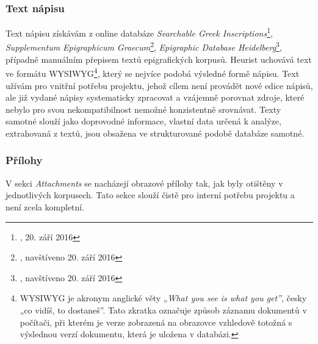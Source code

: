 \subsubsection[text-nápisu]{Text nápisu}

Text nápisu získávám z online databáze {\em Searchable Greek Inscriptions}\footnote{\from[url5], 20. září 2016}, {\em Supplementum Epigraphicum Graecum}\footnote{\from[url6], navštíveno 20. září 2016}, {\em Epigraphic Database Heidelberg}\footnote{\from[url7], navštíveno 20. září 2016}, případně manuálním přepisem textů epigrafických korpusů. Heurist uchovává text ve formátu WYSIWYG\footnote{WYSIWYG je akronym anglické věty „{\em What you see is what you get”}, česky „co vidíš, to dostaneš”. Tato zkratka označuje způsob záznamu dokumentů v počítači, při kterém je verze zobrazená na obrazovce vzhledově totožná s výslednou verzí dokumentu, která je uložena v databázi.}, který se nejvíce podobá výsledné formě nápisu. Text užívám pro vnitřní potřebu projektu, jehož cílem není provádět nové edice nápisů, ale již vydané nápisy systematicky zpracovat a vzájemně porovnat zdroje, které nebylo pro svou nekompatibilnost nemožné konzistentně srovnávat. Texty samotné slouží jako doprovodné informace, vlastní data určená k analýze, extrahovaná z textů, jsou obsažena ve strukturované podobě databáze samotné.

\subsubsection[přílohy]{Přílohy}

V sekci {\em Attachments} se nacházejí obrazové přílohy tak, jak byly otištěny v jednotlivých korpusech. Tato sekce slouží čistě pro interní potřebu projektu a není zcela kompletní.

